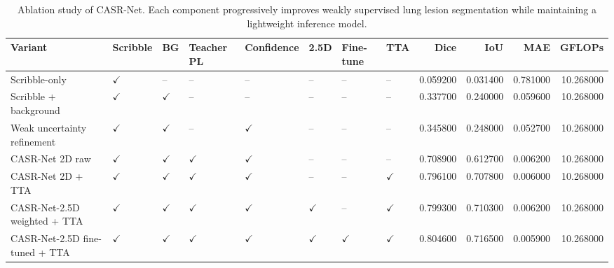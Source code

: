 \begin{table}
\caption{Ablation study of CASR-Net. Each component progressively improves weakly supervised lung lesion segmentation while maintaining a lightweight inference model.}
\label{tab:casrnet_ablation_compact}
\begin{tabular}{llllllllrrrr}
\toprule
Variant & Scribble & BG & Teacher PL & Confidence & 2.5D & Fine-tune & TTA & Dice & IoU & MAE & GFLOPs \\
\midrule
Scribble-only & $\checkmark$ & -- & -- & -- & -- & -- & -- & 0.059200 & 0.031400 & 0.781000 & 10.268000 \\
Scribble + background & $\checkmark$ & $\checkmark$ & -- & -- & -- & -- & -- & 0.337700 & 0.240000 & 0.059600 & 10.268000 \\
Weak uncertainty refinement & $\checkmark$ & $\checkmark$ & -- & $\checkmark$ & -- & -- & -- & 0.345800 & 0.248000 & 0.052700 & 10.268000 \\
CASR-Net 2D raw & $\checkmark$ & $\checkmark$ & $\checkmark$ & $\checkmark$ & -- & -- & -- & 0.708900 & 0.612700 & 0.006200 & 10.268000 \\
CASR-Net 2D + TTA & $\checkmark$ & $\checkmark$ & $\checkmark$ & $\checkmark$ & -- & -- & $\checkmark$ & 0.796100 & 0.707800 & 0.006000 & 10.268000 \\
CASR-Net-2.5D weighted + TTA & $\checkmark$ & $\checkmark$ & $\checkmark$ & $\checkmark$ & $\checkmark$ & -- & $\checkmark$ & 0.799300 & 0.710300 & 0.006200 & 10.268000 \\
CASR-Net-2.5D fine-tuned + TTA & $\checkmark$ & $\checkmark$ & $\checkmark$ & $\checkmark$ & $\checkmark$ & $\checkmark$ & $\checkmark$ & 0.804600 & 0.716500 & 0.005900 & 10.268000 \\
\bottomrule
\end{tabular}
\end{table}
